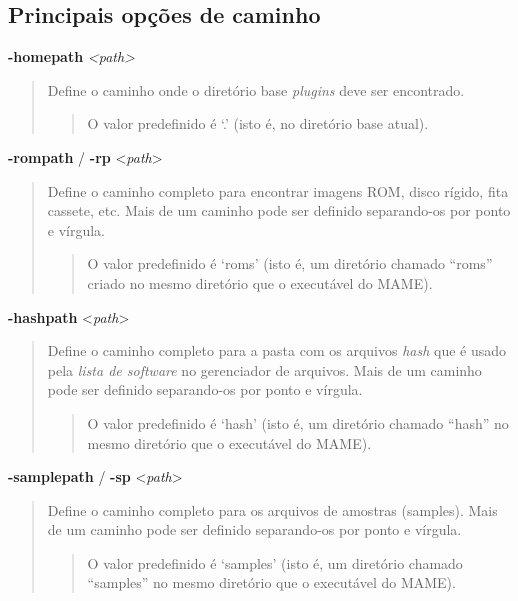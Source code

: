 \documentclass[letterpaper,10pt,brazil]{sphinxmanual}
\begin{document}
\subsection{Principais opções de caminho}
\label{commandline/commandline-all:principais-opcoes-de-caminho}\label{commandline/commandline-all:mame-commandline-homepath}
\textbf{-homepath} \emph{\textless{}path\textgreater{}}
\begin{quote}

Define o caminho onde o diretório base \emph{plugins} deve ser
encontrado.
\begin{quote}

O valor predefinido é `.' (isto é, no diretório base atual).
\end{quote}
\end{quote}
\label{commandline/commandline-all:mame-commandline-rompath}
\textbf{-rompath} / \textbf{-rp} \textless{}\emph{path}\textgreater{}
\begin{quote}

Define o caminho completo para encontrar imagens ROM, disco rígido,
fita cassete, etc. Mais de um caminho pode ser definido separando-os
por ponto e vírgula.
\begin{quote}

O valor predefinido é `roms' (isto é, um diretório chamado
``roms'' criado no mesmo diretório que o executável do MAME).
\end{quote}
\end{quote}
\label{commandline/commandline-all:mame-commandline-hashpath}
\textbf{-hashpath} \textless{}\emph{path}\textgreater{}
\begin{quote}

Define o caminho completo para a pasta com os arquivos \emph{hash} que é
usado pela \emph{lista de software} no gerenciador de arquivos. Mais de
um caminho pode ser definido separando-os por ponto e vírgula.
\begin{quote}

O valor predefinido é `hash' (isto é, um diretório chamado
``hash'' no mesmo diretório que o executável do MAME).
\end{quote}
\end{quote}
\label{commandline/commandline-all:mame-commandline-samplepath}
\textbf{-samplepath} / \textbf{-sp} \textless{}\emph{path}\textgreater{}
\begin{quote}

Define o caminho completo para os arquivos de amostras (samples).
Mais de um caminho pode ser definido separando-os por ponto e
vírgula.
\begin{quote}

O valor predefinido é `samples' (isto é, um diretório chamado
``samples'' no mesmo diretório que o executável do MAME).
\end{quote}
\end{quote}
\end{document}
